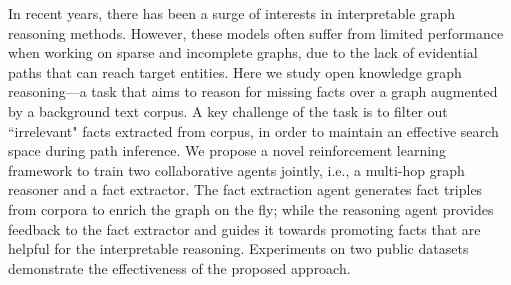 In recent years, there has been a surge of interests in interpretable graph reasoning methods. However, these models often suffer from limited performance when working on sparse and incomplete graphs, due to the lack of evidential paths that can reach target entities. Here we study open knowledge graph reasoning---a task that aims to reason for missing facts over a graph augmented by a background text corpus. A key challenge of the task is to filter out ``irrelevant" facts extracted from corpus, in order to maintain an effective search space during path inference. We propose a novel reinforcement learning framework to train two collaborative agents jointly, i.e., a multi-hop graph reasoner and a fact extractor. The fact extraction agent generates fact triples from corpora to enrich the graph on the fly; while the reasoning agent provides feedback to the fact extractor and guides it towards promoting facts that are helpful for the interpretable reasoning. Experiments on two public datasets demonstrate the effectiveness of the proposed approach.